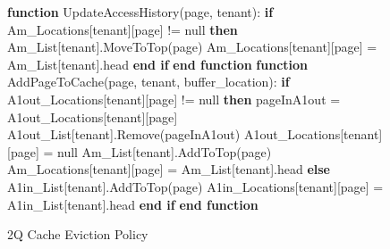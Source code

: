 \begin{figure}[htbp]
    \centering
    \begin{minipage}{\linewidth}
    \begin{algorithm}[H]
        \caption{2Q Cache Eviction Policy}
        \begin{algorithmic}
            \STATE \textbf{function} UpdateAccessHistory(page, tenant):
            \STATE \hspace{\algorithmicindent} \textbf{if} Am\_Locations[tenant][page] != null \textbf{then}
            \STATE \hspace{\algorithmicindent} \hspace{\algorithmicindent} Am\_List[tenant].MoveToTop(page)
            \STATE \hspace{\algorithmicindent} \hspace{\algorithmicindent} Am\_Locations[tenant][page] = Am\_List[tenant].head
            \STATE \hspace{\algorithmicindent} \textbf{end if}
            \STATE \textbf{end function}
            \STATE
            \STATE \textbf{function} AddPageToCache(page, tenant, buffer\_location):
            \STATE \hspace{\algorithmicindent} \textbf{if} A1out\_Locations[tenant][page] != null \textbf{then}
            \STATE \hspace{\algorithmicindent} \hspace{\algorithmicindent} pageInA1out = A1out\_Locations[tenant][page]
            \STATE \hspace{\algorithmicindent} \hspace{\algorithmicindent} A1out\_List[tenant].Remove(pageInA1out)
            \STATE \hspace{\algorithmicindent} \hspace{\algorithmicindent} A1out\_Locations[tenant][page] = null
            \STATE \hspace{\algorithmicindent} \hspace{\algorithmicindent} Am\_List[tenant].AddToTop(page)
            \STATE \hspace{\algorithmicindent} \hspace{\algorithmicindent} Am\_Locations[tenant][page] = Am\_List[tenant].head
            \STATE \hspace{\algorithmicindent} \textbf{else}
            \STATE \hspace{\algorithmicindent} \hspace{\algorithmicindent} A1in\_List[tenant].AddToTop(page)
            \STATE \hspace{\algorithmicindent} \hspace{\algorithmicindent} A1in\_Locations[tenant][page] = A1in\_List[tenant].head
            \STATE \hspace{\algorithmicindent} \textbf{end if}
            \STATE \textbf{end function}


\end{algorithmic}
\end{algorithm}
\end{minipage}
\end{figure}
